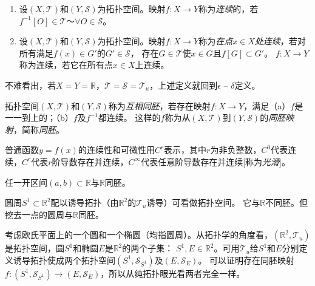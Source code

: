 \begin{definition}
\begin{enumerate}[（a）]
\item 设$(X, \mathscr{T})$和$(Y, \mathscr{S})$为拓扑空间。映射$f \colon X \to Y$称为\emph{连续}的，若$f^{-1}[O] \in \mathscr{T} ～ \forall O \in \mathscr{S}$。
\item 设$(X, \mathscr{T})$和$(Y, \mathscr{S})$为拓扑空间。映射$f \colon X \to Y$称为\emph{在点$x \in X$处连续}，若对所有满足$f(x) \in G'$的$G' \in \mathscr{S}$， 存在$G \in \mathscr{T}$使$x \in G$且$f[G] \subset G'$。
$f \colon X \to Y$称为连续，若它在所有点$x \in X$上连续。
\end{enumerate}
\end{definition}

\begin{note}
不难看出，若$X = Y = \mathbb{R}$，$\mathscr{T} = \mathscr{S} = \mathscr{T}_u$，上述定义就回到$\epsilon$ -- $\delta$定义。
\end{note}

\begin{definition}
拓扑空间$(X, \mathscr{T})$和$(Y, \mathscr{S})$称为\emph{互相同胚}，若存在映射$f \colon X \to Y$，满足（a）$f$是一一到上的；（b）$f$及$f^{-1}$都连续。
这样的$f$称为从$(X, \mathscr{T})$到$(Y, \mathscr{S})$的\emph{同胚映射}，简称\emph{同胚}。   
\end{definition}

普通函数$y = f(x)$的连续性和可微性用$C^r$表示，其中$r$为非负整数，$C^0$代表连续，$C^r$代表$r$阶导数存在并连续，$C^\infty$代表任意阶导数存在并连续[称为\emph{光滑}]。

\begin{example}
任一开区间$(a, b) \subset \mathbb{R}$与$\mathbb{R}$同胚。
\end{example}

\begin{example}
圆周$S^1 \subset \mathbb{R}^2$配以诱导拓扑（由$\mathbb{R}^2$的$\mathscr{T}_u$诱导）可看做拓扑空间。
它与$\mathbb{R}$不同胚。但挖去一点的圆周与$\mathbb{R}$同胚。
\end{example}

\begin{example}
考虑欧氏平面上的一个圆和一个椭圆（均指圆周）。从拓扑学的角度看，$(\mathbb{R}^2, \mathscr{T}_u)$是拓扑空间，圆$S^1$和椭圆$E$是$\mathbb{R}^2$的两个子集：
$S^1, E \in \mathbb{R}^2$。可用$\mathscr{T}_u$给$S^1$和$E$分别定义诱导拓扑使成两个拓扑空间$(S^1, \mathscr{S}_{S^1})$及$(E, \mathscr{S}_E)$。
可以证明存在同胚映射$f \colon (S^1, \mathscr{S}_{S^1}) \to (E, \mathscr{S}_E)$，所以从纯拓扑眼光看两者完全一样。
\end{example}

